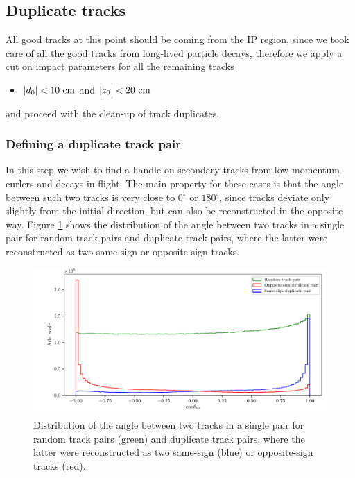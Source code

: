 \subsection{Duplicate tracks}
All good tracks at this point should be coming from the IP region, since we took care of all the good tracks from long-lived particle decays, therefore we apply a cut on impact parameters for all the remaining tracks
\begin{itemize}
\item $\vert d_0 \vert < 10\mathrm{~cm}$ and $\vert z_0 \vert < 20\mathrm{~cm}$
\end{itemize} 

and proceed with the clean-up of track duplicates.

\subsubsection{Defining a duplicate track pair}

In this step we wish to find a handle on secondary tracks from low momentum curlers and decays in flight. The main property for these cases is that the angle between such two tracks is very close to $0^\circ$ or $180^\circ$, since tracks deviate only slightly from the initial direction, but can also be reconstructed in the opposite way. Figure \ref{fig:ROE_dupAngleInit} shows the distribution of the angle between two tracks in a single pair for random track pairs and duplicate track pairs, where the latter were reconstructed as two same-sign or opposite-sign tracks.

\begin{figure}[H]
\centering
\captionsetup{width=0.8\linewidth}
\includegraphics[width=\linewidth]{fig/ROECleanup_dup_angle_initial}
\caption{Distribution of the angle between two tracks in a single pair for random track pairs (green) and duplicate track pairs, where the latter were reconstructed as two same-sign (blue) or opposite-sign tracks (red).}
\label{fig:ROE_dupAngleInit}
\end{figure}

